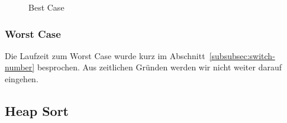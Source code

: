 \begin{figure}[hbt]
    \centering
    \caption{Best Case}
\end{figure}

\subsubsection{Worst Case}\label{subsubsec:worst-case}
Die Laufzeit zum Worst Case wurde kurz im
Abschnitt~\ref{subsubsec:switch-number} besprochen.
Aus zeitlichen Gründen werden wir nicht weiter darauf eingehen.


\FloatBarrier

\subsection{Heap Sort}\label{subsec:heap-sort-laufzeit}
